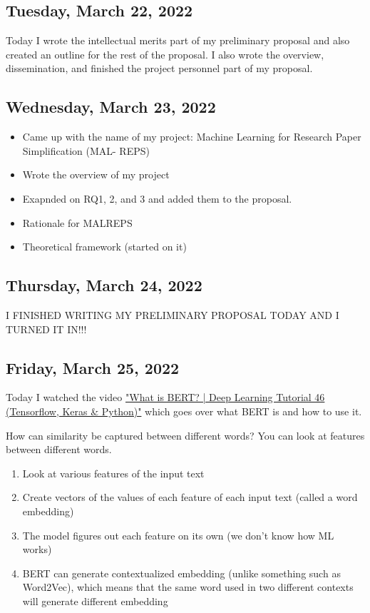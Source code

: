 \documentclass[11pt,letterpaper]{article}
\begin{document}
\subsection{Tuesday, March 22, 2022}
Today I wrote the intellectual merits part of my preliminary proposal and also created an outline for the rest of the proposal. I also wrote the overview, dissemination, and finished the project personnel part of my proposal.

\subsection{Wednesday, March 23, 2022}
\begin{itemize}
    \item Came up with the name of my project: Machine Learning for Research Paper Simplification (MAL-
REPS)
    \item Wrote the overview of my project
    \item Exapnded on RQ1, 2, and 3 and added them to the proposal.
    \item Rationale for MALREPS
    \item Theoretical framework (started on it)

\end{itemize}



\subsection{Thursday, March 24, 2022}
I FINISHED WRITING MY PRELIMINARY PROPOSAL TODAY AND I TURNED IT IN!!!

\subsection{Friday, March 25, 2022}
Today I watched the video \href{https://www.youtube.com/watch?v=7kLi8u2dJz0}{"What is BERT? | Deep Learning Tutorial 46 (Tensorflow, Keras & Python)"} which goes over what BERT is and how to use it.

How can similarity be captured between different words? You can look at features between different words.
\begin{enumerate}
    \item Look at various features of the input text
    \item Create vectors of the values of each feature of each input text (called a word embedding)
    \item The model figures out each feature on its own (we don't know how ML works)
    \item BERT can generate contextualized embedding (unlike something such as Word2Vec), which means that the same word used in two different contexts will generate different embedding
\end{enumerate}
\end{document}
